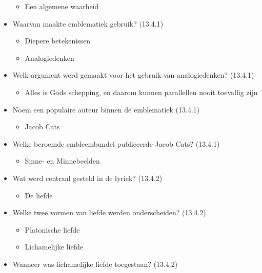 \begin{itemize}
  \begin{itemize}
  \itemsep1pt\parskip0pt
  \item
    Een algemene waarheid
  \end{itemize}
\item
  Waarvan maakte emblematiek gebruik? (13.4.1)

  \begin{itemize}
  \itemsep1pt\parskip0pt
  \item
    Diepere betekenissen
  \item
    Analogiedenken
  \end{itemize}
\item
  Welk argument werd gemaakt voor het gebruik van analogiedenken?
  (13.4.1)

  \begin{itemize}
  \itemsep1pt\parskip0pt
  \item
    Alles is Gods schepping, en daarom kunnen parallellen nooit
    toevallig zijn
  \end{itemize}
\item
  Noem een populaire auteur binnen de emblematiek (13.4.1)

  \begin{itemize}
  \itemsep1pt\parskip0pt
  \item
    Jacob Cats
  \end{itemize}
\item
  Welke beroemde embleembundel publiceerde Jacob Cats? (13.4.1)

  \begin{itemize}
  \itemsep1pt\parskip0pt
  \item
    Sinne- en Minnebeelden
  \end{itemize}
\item
  Wat werd centraal gesteld in de lyriek? (13.4.2)

  \begin{itemize}
  \itemsep1pt\parskip0pt
  \item
    De liefde
  \end{itemize}
\item
  Welke twee vormen van liefde werden onderscheiden? (13.4.2)

  \begin{itemize}
  \itemsep1pt\parskip0pt
  \item
    Platonische liefde
  \item
    Lichamelijke liefde
  \end{itemize}
\item
  Wanneer was lichamelijke liefde toegestaan? (13.4.2)


\end{itemize}

